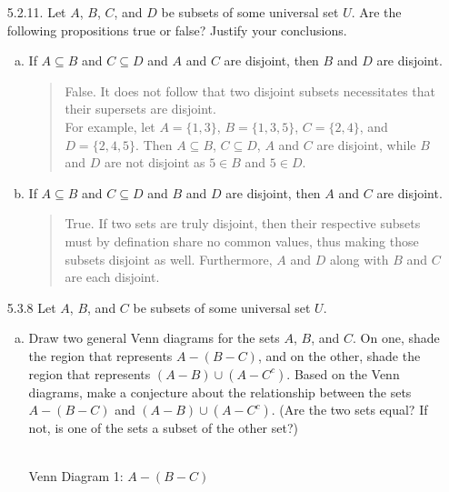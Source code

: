 \documentclass[11pt]{article}
\begin{document}
\begin{itemize}
\item[5.2.11.] Let $A$, $B$, $C$, and $D$ be subsets of some universal set $U$. Are the following propositions true or false? Justify your conclusions.
\begin{enumerate}[(a)]
\item If $A\subseteq B$ and $C\subseteq D$ and $A$ and $C$ are disjoint, then $B$ and $D$ are disjoint.
\begin{quote}
    False. It does not follow that two disjoint subsets necessitates that their supersets are disjoint.\\
    For example, let $A=\{1,3\}$, $B=\{1,3,5\}$, $C=\{2,4\}$, and $D=\{2,4,5\}$. Then $A\subseteq B$, $C\subseteq D$, $A$ and $C$ are disjoint, 
    while $B$ and $D$ are not disjoint as $5\in B$ and $5\in D$.
\end{quote}
\item If $A\subseteq B$ and $C\subseteq D$ and $B$ and $D$ are disjoint, then $A$ and $C$ are disjoint.
\begin{quote}
    True. If two sets are truly disjoint, then their respective subsets must by defination share no common values, thus making those subsets disjoint 
    as well. Furthermore, $A$ and $D$ along with $B$ and $C$ are each disjoint.
\end{quote}
\end{enumerate}

\hrulefill

\item[5.3.8] Let $A$, $B$, and $C$ be subsets of some universal set $U$.
\begin{enumerate}[(a)]
\item Draw two general Venn diagrams for the sets $A$, $B$, and $C$. On one, shade the region that represents $A-(B-C)$, and on the other, shade 
the region that represents $(A-B)\cup(A-C^c)$. Based on the Venn diagrams, make a conjecture about the relationship between the sets $A-(B-C)$ 
and $(A-B)\cup(A-C^c)$. (Are the two sets equal? If not, is one of the sets a subset of the other set?)\\ \\
\begin{center}
    \pagebreak
    Venn Diagram 1: $A-(B-C)$\\
\end{center}
\end{enumerate}
\end{itemize}
\end{document}
